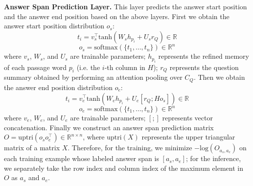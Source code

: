 \documentclass[11pt,a4paper]{article}
\begin{document}
\textbf{Answer Span Prediction Layer.} This layer predicts the answer start position and the answer end position based on the above layers. First we obtain the answer start position distribution $o_s$:
\[t_i = v_s^\top \mathrm{tanh}(W_s h_{p_i} + U_s r_Q) \in \mathbb{R}\]
\[o_s = \mathrm{softmax}(\{t_1, \ldots, t_n\}) \in \mathbb{R}^n\]
where $v_s$, $W_s$, and $U_s$ are trainable parameters; $h_{p_i}$ represents the refined memory of each passage word $p_i$ (i.e. the $i$-th column in $H$); $r_Q$ represents the question summary obtained by performing an attention pooling over $C_Q$. Then we obtain the answer end position distribution $o_e$:
\[t_i = v_e^\top \mathrm{tanh}(W_e h_{p_i} + U_e [r_Q; H o_s]) \in \mathbb{R}\]
\[o_e = \mathrm{softmax}(\{t_1, \ldots, t_n\}) \in \mathbb{R}^n\]
where $v_e$, $W_e$, and $U_e$ are trainable parameters; $[;]$ represents vector concatenation. Finally we construct an answer span prediction matrix $O = \mathrm{uptri}(o_s o_e^\top) \in \mathbb{R}^{n \times n}$, where $\mathrm{uptri}(X)$ represents the upper triangular matrix of a matrix $X$. Therefore, for the training, we minimize $-\mathrm{log}(O_{a_s, a_e})$ on each training example whose labeled answer span is $[a_s, a_e]$; for the inference, we separately take the row index and column index of the maximum element in $O$ as $a_s$ and $a_e$.
\end{document}
